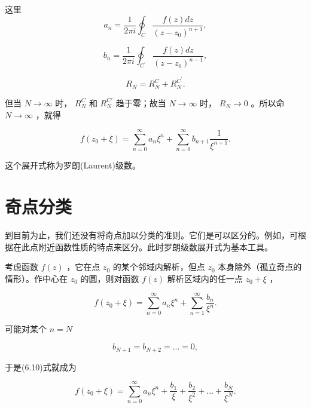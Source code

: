 这里
\begin{equation*}
a _ {n} = \frac {1}{2 \pi i} \oint_ {C} \frac {f (z) d z}{(z - z _ {0}) ^ {n + 1}},
\end{equation*}

\begin{equation*}
b _ {n} = \frac {1}{2 \pi i} \oint_ {C ^ {\prime}} \frac {f (z) d z}{(z - z _ {0}) ^ {n - 1}},
\end{equation*}

\begin{equation*}
R _ {N} = R _ {N} ^ {C} + R _ {N} ^ {C ^ {\prime}}.
\end{equation*}

但当 $N \to \infty$ 时， $R_N^C$ 和 $R_N^{C'}$ 趋于零；故当 $N \to \infty$ 时， $R_N \to 0$ 。所以命 $N \to \infty$ ，就得

\begin{equation*}
f (z _ {0} + \xi) = \sum_ {n = 0} ^ {\infty} a _ {n} \xi^ {n} + \sum_ {n = 0} ^ {\infty} b _ {n + 1} \frac {1}{\xi^ {n + 1}}.
\end{equation*}

这个展开式称为罗朗(Laurent)级数。

\section{奇点分类}

到目前为止，我们还没有将奇点加以分类的准则。它们是可以区分的。例如，可根据在此点附近函数性质的特点来区分。此时罗朗级数展开式为基本工具。

考虑函数 $f(z)$ ，它在点 $z_0$ 的某个邻域内解析，但点 $z_0$ 本身除外（孤立奇点的情形）。作中心在 $z_0$ 的圆，则对函数 $f(z)$ 解析区域内的任一点 $z_0 + \xi$ ，

\begin{equation*}
f (z _ {0} + \xi) = \sum_ {n = 0} ^ {\infty} a _ {n} \xi^ {n} + \sum_ {n = 1} ^ {\infty} \frac {b _ {n}}{\xi^ {n}}.\tag{6.10}
\end{equation*}

可能对某个 $n = N$

\begin{equation*}
b _ {N + 1} = b _ {N + 2} = \dots = 0,
\end{equation*}

于是(6.10)式就成为

\begin{equation*}
f (z _ {0} + \xi) = \sum_ {n = 0} ^ {\infty} a _ {n} \xi^ {n} + \frac {b _ {1}}{\xi} + \frac {b _ {2}}{\xi^ {2}} + \dots + \frac {b _ {N}}{\xi^ {N}}.
\end{equation*}

